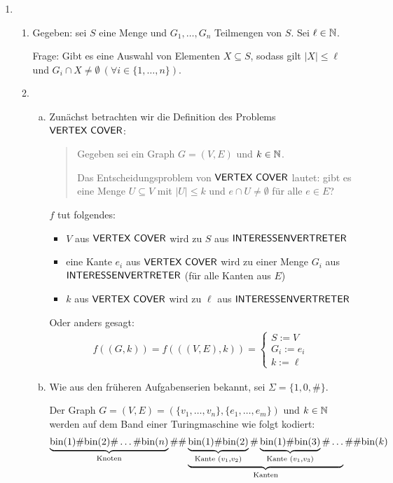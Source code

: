 \begin{enumerate}
  \item \begin{enumerate}[1.]
      \item Gegeben: sei $S$ eine Menge und $G_1, \ldots, G_n$ Teilmengen von
        $S$. Sei $\ell \in \mathbb{N}$.

        Frage: Gibt es eine Auswahl von Elementen $X \subseteq S$, sodass gilt
        $|X| \leq \ell$ und
        $G_i \cap X \neq \emptyset \ (\forall i \in \{1, \ldots, n\})$.

      \item \begin{enumerate}[(a)]
        \item Zunächst betrachten wir die Definition des Problems $\textsf{VERTEX COVER}$:
          \begin{quote}
            Gegeben sei ein Graph $G = (V,E)$ und $k \in \mathbb{N}$.

            Das Entscheidungsproblem von $\textsf{VERTEX COVER}$ lautet:
            gibt es eine Menge $U \subseteq V$ mit $|U| \leq k$ und
            $e \cap U \neq \emptyset$ für alle $e \in E$?
          \end{quote}
          $f$ tut folgendes:
          \begin{itemize}
            \item $V$ aus $\textsf{VERTEX COVER}$ wird zu $S$ aus $\textsf{INTERESSENVERTRETER}$
            \item eine Kante $e_i$ aus $\textsf{VERTEX COVER}$ wird zu einer Menge $G_i$ aus $\textsf{INTERESSENVERTRETER}$
              (für alle Kanten aus $E$)
            \item $k$ aus $\textsf{VERTEX COVER}$ wird zu $\ell$ aus $\textsf{INTERESSENVERTRETER}$
          \end{itemize}

          Oder anders gesagt:
          \begin{align*}
            f((G,k)) = f(((V, E), k)) = \begin{cases}
              S := V\\
              G_i := e_i\\
              k := \ell
            \end{cases}
          \end{align*}

        \item Wie aus den früheren Aufgabenserien bekannt, sei
          $\Sigma = \{1, 0, \#\}$.

          Der Graph
          $G = (V, E) = (\{v_1, \ldots, v_n\}, \{e_1, \ldots, e_m\})$
          und $k \in \mathbb{N}$
          werden auf dem Band einer Turingmaschine wie folgt kodiert:
          \begin{align*}
            \underbrace{\bin(1) \# \bin(2) \# \ldots \# \bin(n)}_{\text{Knoten}}
            \# \#
            \underbrace{%
              \underbrace{\bin(1) \# \bin(2)}_{\text{Kante\ } (v_1, v_2)}
              \#
              \underbrace{\bin(1) \# \bin(3)}_{\text{Kante\ } (v_1, v_3)}
              \#
              \ldots
            }_{\text{Kanten}}
            \# \#
            \bin(k)
          \end{align*}


\end{enumerate}
\end{enumerate}
\end{enumerate}
